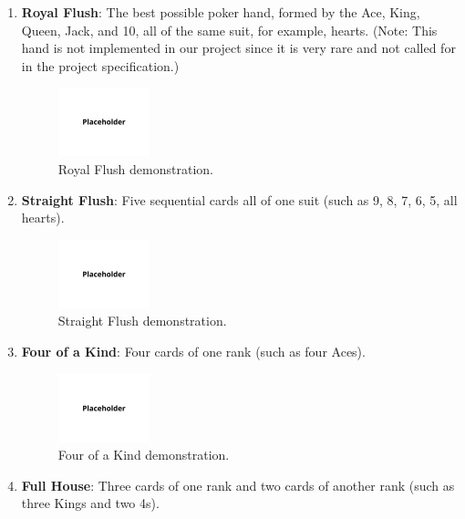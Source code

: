 \begin{enumerate}
    \item \textbf{Royal Flush}: The best possible poker hand, formed by the Ace, King, Queen, Jack, and 10, all of the same suit, for example, hearts. (Note: This hand is not implemented in our project since it is very rare and not called for in the project specification.)
    \begin{figure}[H]
        \centering
        \includegraphics[width=0.25\textwidth]{figures/placeholder.png}
        \caption{Royal Flush demonstration.}
        \label{fig:royal-flush}
    \end{figure}
    \item \textbf{Straight Flush}: Five sequential cards all of one suit (such as 9, 8, 7, 6, 5, all hearts).
    \begin{figure}[H]
        \centering
        \includegraphics[width=0.25\textwidth]{figures/placeholder.png}
        \caption{Straight Flush demonstration.}
        \label{fig:straight-flush}
    \end{figure}
    \item \textbf{Four of a Kind}: Four cards of one rank (such as four Aces).
    \begin{figure}[H]
        \centering
        \includegraphics[width=0.25\textwidth]{figures/placeholder.png}
        \caption{Four of a Kind demonstration.}
        \label{fig:four-of-a-kind}
    \end{figure}
    \item \textbf{Full House}: Three cards of one rank and two cards of another rank (such as three Kings and two 4s).
    \begin{figure}[H]

\end{figure}
\end{enumerate}
